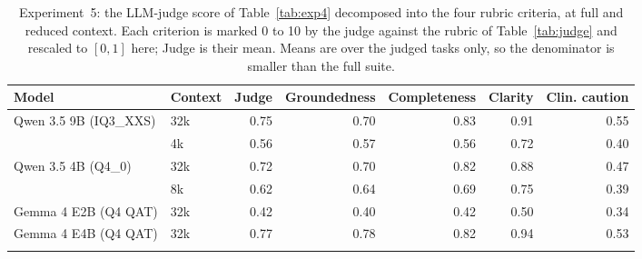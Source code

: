 \begin{table}[H]
\centering
\caption{Experiment~5: the LLM-judge score of Table~\ref{tab:exp4} decomposed into the four rubric criteria, at full and reduced context. Each criterion is marked 0 to 10 by the judge against the rubric of Table~\ref{tab:judge} and rescaled to $[0,1]$ here; Judge is their mean. Means are over the judged tasks only, so the denominator is smaller than the full suite.}
\label{tab:exp4_judge}
\small
\setlength{\tabcolsep}{5pt}
\begin{tabular}{@{}ll rrrrr@{}}
\toprule
Model & Context & Judge & Groundedness & Completeness & Clarity & Clin. caution \\
\midrule
Qwen 3.5 9B (IQ3\_XXS) & 32k & 0.75 & 0.70 & 0.83 & 0.91 & 0.55 \\
 & 4k & 0.56 & 0.57 & 0.56 & 0.72 & 0.40 \\
\addlinespace
Qwen 3.5 4B (Q4\_0) & 32k & 0.72 & 0.70 & 0.82 & 0.88 & 0.47 \\
 & 8k & 0.62 & 0.64 & 0.69 & 0.75 & 0.39 \\
\addlinespace
Gemma 4 E2B (Q4 QAT) & 32k & 0.42 & 0.40 & 0.42 & 0.50 & 0.34 \\
\addlinespace
Gemma 4 E4B (Q4 QAT) & 32k & 0.77 & 0.78 & 0.82 & 0.94 & 0.53 \\
\addlinespace
\bottomrule
\end{tabular}
\end{table}
